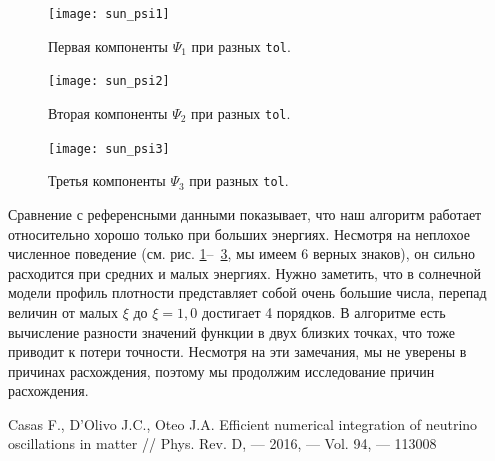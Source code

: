 \documentclass[12pt]{article}
\begin{document}
\begin{figure}[htb]
  \hspace*{-2em}
  \texttt{[image: sun\_psi1]}
  \caption{\label{fig:9}Первая компоненты \(\Psi_{1}\) при разных \texttt{tol}.}
\end{figure}

\begin{figure}[htb]
  \hspace*{-2em}
  \texttt{[image: sun\_psi2]}
  \caption{\label{fig:10}Вторая компоненты \(\Psi_{2}\) при разных \texttt{tol}.}
\end{figure}

\begin{figure}[htb]
  \hspace*{-2em}
  \texttt{[image: sun\_psi3]}
  \caption{\label{fig:11}Третья компоненты \(\Psi_{3}\) при разных \texttt{tol}.}
\end{figure}

Сравнение с референсными данными показывает, что наш алгоритм работает
относительно хорошо только при больших энергиях. Несмотря на неплохое численное
поведение (см. рис. \ref{fig:9}–~\ref{fig:11}, мы имеем 6 верных знаков), он
сильно расходится при средних и малых энергиях. Нужно заметить, что в солнечной
модели профиль плотности представляет собой очень большие числа, перепад величин
от малых \(\xi\) до \(\xi=1{,}0\) достигает 4 порядков. В алгоритме есть
вычисление разности значений функции в двух близких точках, что тоже приводит к
потери точности. Несмотря на эти замечания, мы не уверены в причинах
расхождения, поэтому мы продолжим исследование причин расхождения.

\begin{thebibliography}{99}
 Casas F., D'Olivo J.C., Oteo J.A. Efficient numerical
  integration of neutrino oscillations in matter // Phys. Rev. D, — 2016, —
  Vol. 94, — 113008
\end{thebibliography}
\end{document}
